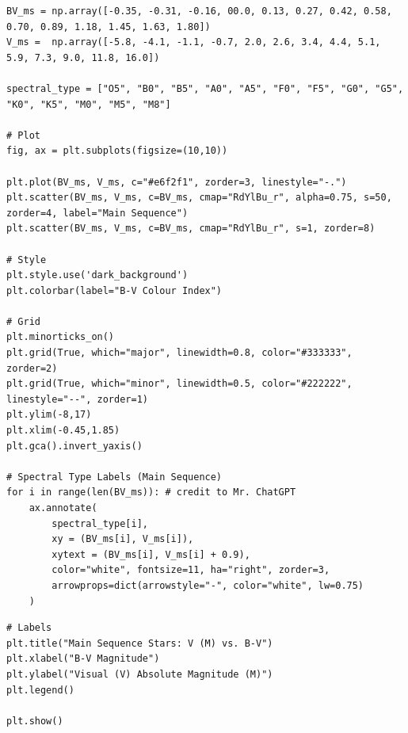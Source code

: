 \documentclass[12pt]{article}
\begin{document}
\begin{minipage}{\linewidth}
\captionsetup{hypcap=false}

\begin{mintedbox}
\begin{verbatim}
BV_ms = np.array([-0.35, -0.31, -0.16, 00.0, 0.13, 0.27, 0.42, 0.58, 0.70, 0.89, 1.18, 1.45, 1.63, 1.80])
V_ms =  np.array([-5.8, -4.1, -1.1, -0.7, 2.0, 2.6, 3.4, 4.4, 5.1, 5.9, 7.3, 9.0, 11.8, 16.0])

spectral_type = ["O5", "B0", "B5", "A0", "A5", "F0", "F5", "G0", "G5", "K0", "K5", "M0", "M5", "M8"]

# Plot
fig, ax = plt.subplots(figsize=(10,10))

plt.plot(BV_ms, V_ms, c="#e6f2f1", zorder=3, linestyle="-.")
plt.scatter(BV_ms, V_ms, c=BV_ms, cmap="RdYlBu_r", alpha=0.75, s=50, zorder=4, label="Main Sequence")
plt.scatter(BV_ms, V_ms, c=BV_ms, cmap="RdYlBu_r", s=1, zorder=8)

# Style
plt.style.use('dark_background')
plt.colorbar(label="B-V Colour Index")

# Grid
plt.minorticks_on()
plt.grid(True, which="major", linewidth=0.8, color="#333333", zorder=2)
plt.grid(True, which="minor", linewidth=0.5, color="#222222", linestyle="--", zorder=1)
plt.ylim(-8,17)
plt.xlim(-0.45,1.85)
plt.gca().invert_yaxis()

# Spectral Type Labels (Main Sequence) 
for i in range(len(BV_ms)): # credit to Mr. ChatGPT
    ax.annotate(
        spectral_type[i],
        xy = (BV_ms[i], V_ms[i]),
        xytext = (BV_ms[i], V_ms[i] + 0.9),
        color="white", fontsize=11, ha="right", zorder=3,
        arrowprops=dict(arrowstyle="-", color="white", lw=0.75)
    )

\end{verbatim}
\end{mintedbox}

\end{minipage}

\begin{minipage}{\linewidth}
\captionsetup{hypcap=false}

\begin{mintedbox}
\begin{verbatim}
# Labels
plt.title("Main Sequence Stars: V (M) vs. B-V")
plt.xlabel("B-V Magnitude")
plt.ylabel("Visual (V) Absolute Magnitude (M)")
plt.legend()

plt.show()

\end{verbatim}
\end{mintedbox}

\end{minipage}
\end{document}
